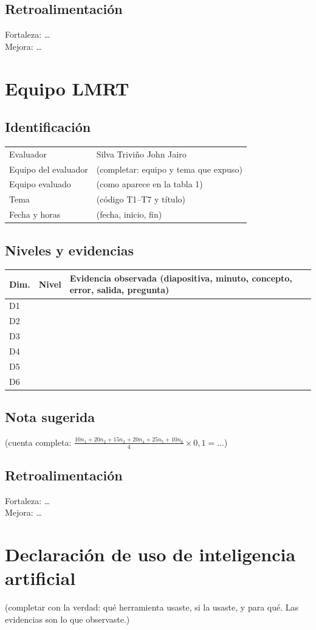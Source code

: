 \documentclass[11pt,a4paper]{article}
\begin{document}
\subsection*{Retroalimentación}
Fortaleza: \dots\\
Mejora: \dots


\section{Equipo LMRT}
\subsection*{Identificación}
\begin{tabular}{@{}p{4cm}p{10cm}@{}}
Evaluador & Silva Triviño John Jairo\\
Equipo del evaluador & (completar: equipo y tema que expuso)\\
Equipo evaluado & (como aparece en la tabla 1)\\
Tema & (código T1--T7 y título)\\
Fecha y horas & (fecha, inicio, fin)\\
\end{tabular}
\subsection*{Niveles y evidencias}
\begin{tabular}{@{}lcp{11cm}@{}}
\toprule
Dim. & Nivel & Evidencia observada (diapositiva, minuto, concepto, error, salida, pregunta)\\
\midrule
D1 & & \\
D2 & & \\
D3 & & \\
D4 & & \\
D5 & & \\
D6 & & \\
\bottomrule
\end{tabular}
\subsection*{Nota sugerida}
(cuenta completa: $\frac{10 n_1+20 n_2+15 n_3+20 n_4+25 n_5+10 n_6}{4}\times 0{,}1 = \dots$)
\subsection*{Retroalimentación}
Fortaleza: \dots\\
Mejora: \dots


\section{Declaración de uso de inteligencia artificial}
(completar con la verdad: qué herramienta usaste, si la usaste, y para qué. Las evidencias son lo que observaste.)
\end{document}
